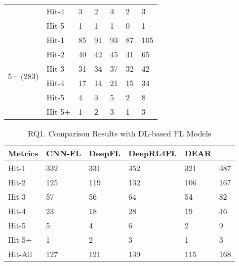 \begin{table}[t]
{\begin{center}
\begin{tabular}{p{1.3cm}<{\centering}|p{0.8cm}<{\centering}|p{1cm}<{\centering}|p{0.8cm}<{\centering}|p{1.3cm}<{\centering}|p{1cm}<{\centering}|p{1.3cm}<{\centering}}
				& Hit-4     & 3 & 2 & 3 & 2& 3 \\
				& Hit-5     & 1 & 1 & 1 &0 & 1 \\
				\hline
				\multirow{6}{*}{5+ (283)}  & Hit-1 & 85 & 91 & 93 & 87 & 105 \\
				& Hit-2     & 40 & 42 & 45 & 41& 65 \\
				& Hit-3     & 31 & 34 & 37 & 32& 42 \\
				& Hit-4     & 17 & 14 & 21 & 15& 34 \\
				& Hit-5     & 4 & 3 & 5 & 2& 8 \\
				& Hit-5+    & 1 & 2 & 3 & 1& 3 \\
				\hline
			\end{tabular}
			
			\label{fig:rq1-details}
		\end{center}
	}
\end{table}

\begin{table}[t]
	\caption{RQ1. Comparison Results with DL-based FL Models}
	\vspace{-10pt}
	{\small
		\begin{center}
			\renewcommand{\arraystretch}{1}
			\begin{tabular}{p{1.2cm}<{\centering}|p{1cm}<{\centering}|p{0.8cm}<{\centering}|p{1.2cm}<{\centering}|p{1cm}<{\centering}|p{1.2cm}<{\centering}}
				\hline
				Metrics & CNN-FL & DeepFL & DeepRL4FL & DEAR & \tool \\			
				\hline
				Hit-1   & 332 & 331 & 352 & 321 & 387 \\
				Hit-2	& 125 & 119 & 132 & 106 & 167 \\
				Hit-3	& 57 & 56 & 64 & 54 & 82 \\
				Hit-4	& 23 & 18 & 28 & 19 & 46 \\
				Hit-5	& 5 & 4 & 6 & 2 & 9 \\
				Hit-5+	& 1 & 2 & 3 & 1 & 3 \\
                                Hit-All & 127  & 121  & 139  & 115 & 168\\
				\hline
			\end{tabular}
			
			\label{fig:rq1-overview}
		\end{center}
	}
\end{table}

